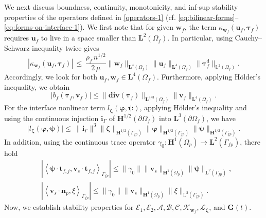 \documentclass[11pt]{article}
\numberwithin{equation}{section}
\newcommand{\bvarphi}{{\boldsymbol\varphi}}
\newcommand{\bpsi}{{\boldsymbol\psi}}
\newcommand{\btau}{{\boldsymbol\tau}}
\newcommand{\bzeta}{{\boldsymbol\zeta}}
\newcommand{\bv}{{\mathbf{v}}}
\newcommand{\bw}{{\mathbf{w}}}
\newcommand{\bi}{\mathbf{i}}
\newcommand{\bu}{\mathbf{u}}
\newcommand{\bt}{{\mathbf{t}}}
\newcommand{\bn}{{\mathbf{n}}}
\newcommand{\0}{{\mathbf{0}}}
\def\bG{\mathbf{G}}
\newcommand{\bL}{\mathbf{L}}
\newcommand\bH{\mathbf{H}}
\newcommand\bbL{\mathbb{L}}
\newcommand{\cA}{\mathcal{A}}
\newcommand{\cB}{\mathcal{B}}
\newcommand{\cC}{\mathcal{C}}
\newcommand{\cE}{\mathcal{E}}
\newcommand{\cK}{\mathcal{K}}
\newcommand{\cL}{\mathcal{L}}
\def\L{\mathrm{L}}
\def\rd{\mathrm{d}}
\def\bdiv{\mathbf{div}}
\def\pil{\left<}
\def\pir{\right>}
\numberwithin{equation}{section}
\begin{document}
We next discuss boundness, continuity, monotonicity, and inf-sup stability properties of the operators defined in \eqref{operators-1} (cf. \eqref{eq:bilinear-forms}--\eqref{eq:forms-on-interface-1}). 
We first note that for given $\bw_f$, the term $\kappa_{\bw_f}(\bu_f,\btau_f)$ requires $\bu_f$ to live in a space smaller than $\bL^2(\Omega_f)$. In particular, using Cauchy--Schwarz inequality twice gives
%
\begin{equation}\label{kappa-cont}
|\kappa_{\bw_f}(\bu_f,\btau_f)| 
\,\le\, \frac{\rho_f\,n^{1/2}}{2\,\mu} \|\bw_f\|_{\bL^4(\Omega_f)}\|\bu_f\|_{\bL^4(\Omega_f)}\|\btau^\rd_f\|_{\bbL^2(\Omega_f)}.
\end{equation}
%
Accordingly, we look for both $\bu_f, \bw_f \in \bL^4(\Omega_f)$. Furthermore, applying H\"older's inequality, we obtain
%
\begin{equation}\label{bf-cont}
|b_f(\btau_f,\bv_f)| \leq \|\bdiv(\btau_f)\|_{\bL^{4/3}(\Omega_f)} \|\bv_f\|_{\bL^4(\Omega_f)}.
\end{equation}
%
For the interface nonlinear term $l_{\bzeta}(\bvarphi,\bpsi)$, applying H\"older's inequality and using the continuous injection $\bi_\Gamma$ of $\bH^{1/2}(\partial \Omega_f)$ into $\bL^3(\partial \Omega_f)$, we have
%
\begin{equation}\label{eq:injection-H1/2-into-L3-interface}
\big|l_{\bzeta}(\bvarphi,\bpsi)\big|\leq\ \|\bi_{\Gamma}\|^3 \|\bzeta\|_{\bH^{1/2}(\Gamma_{fp})} \|\bvarphi\|_{\bH^{1/2}(\Gamma_{fp})} \|\bpsi\|_{\bH^{1/2}(\Gamma_{fp})}.
\end{equation}
%
In addition, using the continuous trace operator
$\gamma_0: \bH^1(\Omega_p) \to \bL^2(\Gamma_{fp})$, there hold
%
\begin{align}
  &  |\pil\bpsi\cdot\bt_{f,j},\bv_s\cdot\bt_{f,j}\pir_{\Gamma_{fp}}| \leq \|\gamma_0\|\|\bv_s\|_{\bH^1(\Omega_p)} \|\bpsi\|_{\bL^2(\Gamma_{fp})}, \label{bjs-cont} \\
  & |\pil\bv_s\cdot\bn_p,\xi\pir_{\Gamma_{fp}}| \leq \|\gamma_0\|\|\bv_s\|_{\bH^1(\Omega_p)} \|\xi\|_{\L^2(\Gamma_{fp})}. \label{cgamma-cont-1} 
\end{align}
Now, we establish stability properties for  $\cE_1, \cE_2, \cA, \cB, \cC, \cK_{\bw_f}, \cL_{\bzeta}$, and $\bG(t)$. 
\end{document}
